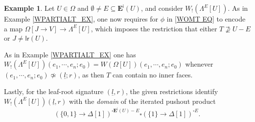 \documentclass[a4paper,10pt]{article}%
\numberwithin{equation}{section}
\numberwithin{figure}{section}
\theoremstyle{definition} %
\newtheorem{example}[equation]{Example}%
\begin{document}
\begin{example}\label{WPARTIALT2_EX}
	Let $U\in \Omega$ and 
	$\emptyset \neq E \subseteq \boldsymbol{E}^{\mathsf{i}}(U)$,
	and consider $W_!(\Lambda^E[U])$.
	As in Example \ref{WPARTIALT_EX},
	one now requires for $\phi$ in \eqref{WOMT EQ}
	to encode a map
	$\Omega[J \to V] \to \Lambda^E[U]$,
	which imposes the restriction that
	either $T \not \supseteq U-E$ or
	$J \neq \mathsf{lr}(U)$. 
		
	As in Example \ref{WPARTIALT_EX}
	one has 
	$W_!(\Lambda^E[U])(e_1,\cdots,e_n;e_0) = W(\Omega[U])(e_1,\cdots,e_n;e_0)$
	whenever $(e_1,\cdots,e_n;e_0) \not \simeq (\underline{l};r)$,
	as then $T$ can contain no inner faces.

	Lastly, for the leaf-root signature $(\underline{l},r)$,
	the given restrictions identify
	$W_!(\Lambda^E[U])(\underline{l},r)$ 
	with the \emph{domain} of the iterated pushout product
\[
	\left(
	\{0,1\} \to \Delta[1]
	\right)^{\square \boldsymbol{E}^{\mathsf{i}}(U)-E}
	\square
	\left(
	\{1\} \to \Delta[1]
	\right)^{\square E}.
\]
\end{example}






        
\end{document}
